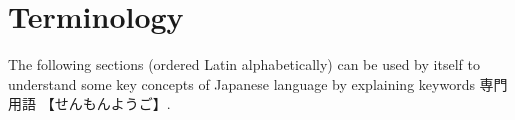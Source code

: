 \chapter{Terminology}
\label{chap:Terminology}
\label{sec:Terminology}

The following sections (ordered Latin alphabetically) can be used by itself to
understand some key concepts of Japanese language by explaining keywords
{専門用語} {【せんもんようご】}.


